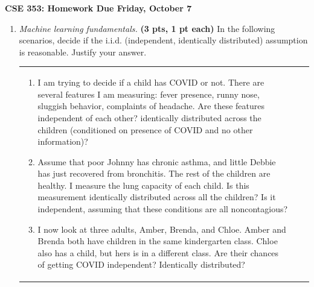 \documentclass{article}
\newcommand{\mypagebreak}{\begin{center}
		\noindent\makebox[\linewidth]{\rule{7.5in}{1pt}}
	\end{center}}
\newcommand{\showpoints}[1]{\textbf{(#1)}}
\begin{document}
{\Large\textbf{CSE 353: Homework  \hfill
Due Friday, October 7 }}


\mypagebreak


\begin{enumerate}

\item \emph{Machine learning fundamentals.} \showpoints{3 pts, 1 pt each} In the following scenarios, decide if the i.i.d. (independent, identically distributed) assumption is reasonable. Justify your answer.


\begin{tabular}[t]{lll}
\begin{minipage}{.7\linewidth}
\begin{enumerate}
\item I am trying to decide if a child has COVID or not. There are several features I am measuring: fever presence, runny nose, sluggish behavior, complaints of headache. Are these features independent of each other? identically distributed across the children (conditioned on presence of COVID and no other information)?


\item Assume that poor Johnny has chronic asthma, and little Debbie has just recovered from bronchitis. The rest of the children are healthy. I measure the lung capacity of each child. Is this measurement identically distributed across all the children? Is it independent, assuming that these conditions are all noncontagious?



\item I now look at three adults, Amber, Brenda, and Chloe. Amber and Brenda both have children in the same kindergarten class. Chloe also has a child, but hers is in a different class. Are their chances of getting COVID independent? Identically distributed?




\end{enumerate}
\end{minipage}
\end{tabular}
\end{enumerate}
\end{document}
